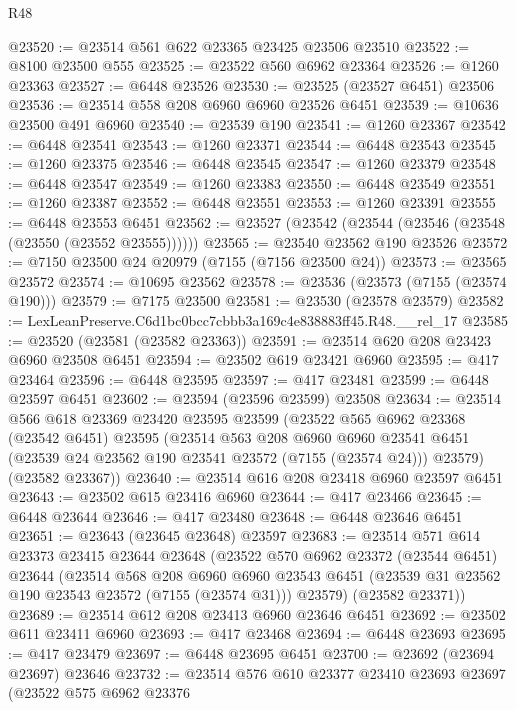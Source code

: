 \begin{lexlean}{R48}
\begin{coremodule}
@23520 := @23514 @561 @622 @23365 @23425 @23506 @23510
@23522 := @8100 @23500 @555
@23525 := @23522 @560 @6962 @23364
@23526 := @1260 @23363
@23527 := @6448 @23526
@23530 := @23525 (@23527 @6451) @23506
@23536 := @23514 @558 @208 @6960 @6960 @23526 @6451
@23539 := @10636 @23500 @491 @6960
@23540 := @23539 @190
@23541 := @1260 @23367
@23542 := @6448 @23541
@23543 := @1260 @23371
@23544 := @6448 @23543
@23545 := @1260 @23375
@23546 := @6448 @23545
@23547 := @1260 @23379
@23548 := @6448 @23547
@23549 := @1260 @23383
@23550 := @6448 @23549
@23551 := @1260 @23387
@23552 := @6448 @23551
@23553 := @1260 @23391
@23555 := @6448 @23553 @6451
@23562 := @23527 (@23542 (@23544 (@23546 (@23548 (@23550 (@23552 @23555))))))
@23565 := @23540 @23562 @190 @23526
@23572 := @7150 @23500 @24 @20979 (@7155 (@7156 @23500 @24))
@23573 := @23565 @23572
@23574 := @10695 @23562
@23578 := @23536 (@23573 (@7155 (@23574 @190)))
@23579 := @7175 @23500
@23581 := @23530 (@23578 @23579)
@23582 := LexLeanPreserve.C6d1bc0bcc7cbbb3a169c4e838883ff45.R48.__rel_17
@23585 := @23520 (@23581 (@23582 @23363))
@23591 := @23514 @620 @208 @23423 @6960 @23508 @6451
@23594 := @23502 @619 @23421 @6960
@23595 := @417 @23464
@23596 := @6448 @23595
@23597 := @417 @23481
@23599 := @6448 @23597 @6451
@23602 := @23594 (@23596 @23599) @23508
@23634 := @23514
    @566
    @618
    @23369
    @23420
    @23595
    @23599
    (@23522
      @565
      @6962
      @23368
      (@23542 @6451)
      @23595
      (@23514
        @563
        @208
        @6960
        @6960
        @23541
        @6451
        (@23539 @24 @23562 @190 @23541 @23572 (@7155 (@23574 @24)))
        @23579)
      (@23582 @23367))
@23640 := @23514 @616 @208 @23418 @6960 @23597 @6451
@23643 := @23502 @615 @23416 @6960
@23644 := @417 @23466
@23645 := @6448 @23644
@23646 := @417 @23480
@23648 := @6448 @23646 @6451
@23651 := @23643 (@23645 @23648) @23597
@23683 := @23514
    @571
    @614
    @23373
    @23415
    @23644
    @23648
    (@23522
      @570
      @6962
      @23372
      (@23544 @6451)
      @23644
      (@23514
        @568
        @208
        @6960
        @6960
        @23543
        @6451
        (@23539 @31 @23562 @190 @23543 @23572 (@7155 (@23574 @31)))
        @23579)
      (@23582 @23371))
@23689 := @23514 @612 @208 @23413 @6960 @23646 @6451
@23692 := @23502 @611 @23411 @6960
@23693 := @417 @23468
@23694 := @6448 @23693
@23695 := @417 @23479
@23697 := @6448 @23695 @6451
@23700 := @23692 (@23694 @23697) @23646
@23732 := @23514
    @576
    @610
    @23377
    @23410
    @23693
    @23697
    (@23522
      @575
      @6962
      @23376

\end{coremodule}
\end{lexlean}
